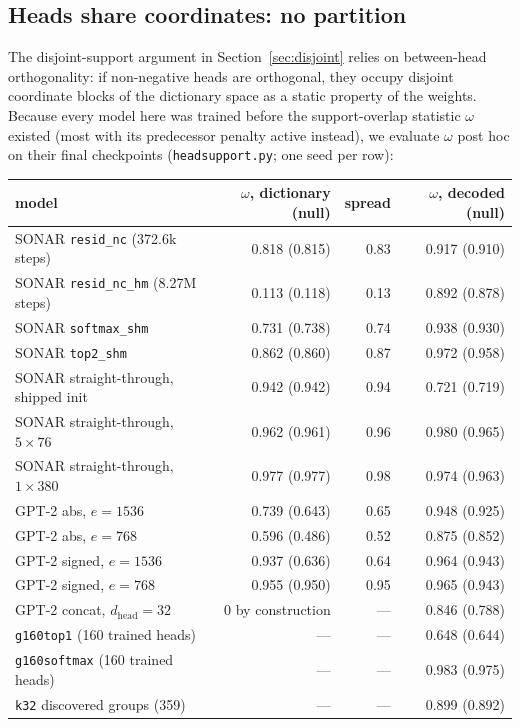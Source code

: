 \subsection{Heads share coordinates: no partition}
\label{sec:support}

The disjoint-support argument in Section~\ref{sec:disjoint} relies on
between-head orthogonality: if non-negative heads are orthogonal, they
occupy disjoint coordinate blocks of the dictionary space as a static
property of the weights. Because every model here was
trained before the support-overlap statistic $\omega$ existed (most with
its predecessor penalty active instead), we evaluate $\omega$ post hoc on
their final checkpoints (\texttt{headsupport.py}; one seed per row):

\begin{center}\small\setlength{\tabcolsep}{4pt}
\begin{tabular}{@{}lrrr@{}}
\toprule
model & $\omega$, dictionary (null) & spread & $\omega$, decoded (null) \\
\midrule
SONAR \texttt{resid\_nc} (372.6k steps) & 0.818 (0.815) & 0.83 & 0.917 (0.910) \\
SONAR \texttt{resid\_nc\_hm} (8.27M steps) & 0.113 (0.118) & 0.13 & 0.892 (0.878) \\
SONAR \texttt{softmax\_shm} & 0.731 (0.738) & 0.74 & 0.938 (0.930) \\
SONAR \texttt{top2\_shm} & 0.862 (0.860) & 0.87 & 0.972 (0.958) \\
SONAR straight-through, shipped init & 0.942 (0.942) & 0.94 & 0.721 (0.719) \\
SONAR straight-through, $5\times76$ & 0.962 (0.961) & 0.96 & 0.980 (0.965) \\
SONAR straight-through, $1\times380$ & 0.977 (0.977) & 0.98 & 0.974 (0.963) \\
GPT-2 abs, $e{=}1536$ & 0.739 (0.643) & 0.65 & 0.948 (0.925) \\
GPT-2 abs, $e{=}768$ & 0.596 (0.486) & 0.52 & 0.875 (0.852) \\
GPT-2 signed, $e{=}1536$ & 0.937 (0.636) & 0.64 & 0.964 (0.943) \\
GPT-2 signed, $e{=}768$ & 0.955 (0.950) & 0.95 & 0.965 (0.943) \\
GPT-2 concat, $d_{\mathrm{head}}{=}32$ & 0 by construction & --- & 0.846 (0.788) \\
\midrule
\texttt{g160top1} (160 trained heads) & --- & --- & 0.648 (0.644) \\
\texttt{g160softmax} (160 trained heads) & --- & --- & 0.983 (0.975) \\
\texttt{k32} discovered groups (359) & --- & --- & 0.899 (0.892) \\
\bottomrule
\end{tabular}
\end{center}

